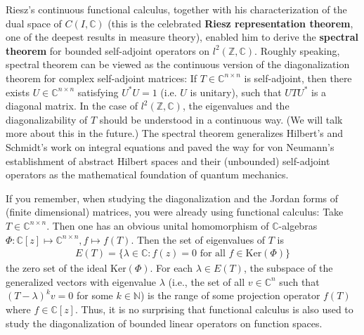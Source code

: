 \documentclass[12pt,b5paper,notitlepage]{article}
\theoremstyle{definition}
\theoremstyle{plain}
\newcommand{\Cbb}{\mathbb C}
\newcommand{\Nbb}{\mathbb N}
\newcommand{\Zbb}{\mathbb Z}
\newcommand{\Ker}{\mathrm{Ker}}
\numberwithin{equation}{section}
\begin{document}
Riesz's continuous functional calculus, together with his characterization of the dual space of $C(I,\Cbb)$ (this is the celebrated \textbf{Riesz representation theorem}, one of the deepest results in measure theory), enabled him to derive the \textbf{spectral theorem} for bounded self-adjoint operators on $l^2(\Zbb,\Cbb)$. Roughly speaking, spectral theorem can be viewed as the continuous version of the diagonalization theorem for complex self-adjoint matrices: If $T\in \Cbb^{n\times n}$ is self-adjoint, then there exists $U\in\Cbb^{n\times n}$ satisfying $U^*U=1$ (i.e. $U$ is unitary), such that $UTU^*$ is a diagonal matrix. In the case of $l^2(\Zbb,\Cbb)$, the eigenvalues and the diagonalizability of $T$ should be understood in a continuous way. (We will talk more about this in the future.) The spectral theorem generalizes Hilbert's and Schmidt's work on integral equations and paved the way for von Neumann's establishment of abstract Hilbert spaces and their (unbounded) self-adjoint operators as the mathematical foundation of quantum mechanics.




If you remember, when studying the diagonalization and the Jordan forms of (finite dimensional) matrices, you were already using functional calculus: Take $T\in\Cbb^{n\times n}$. Then one has an obvious unital homomorphism of $\Cbb$-algebras $\Phi:\Cbb[z]\mapsto\Cbb^{n\times n},f\mapsto f(T)$. Then the set of eigenvalues of $T$ is 
\begin{align*}
E(T)=\{\lambda\in\Cbb:f(z)=0\text{ for all }f\in\Ker(\Phi)\}
\end{align*}
the zero set of the ideal $\Ker(\Phi)$. For each $\lambda\in E(T)$,  the subspace of the generalized vectors with eigenvalue $\lambda$ (i.e., the set of all $v\in \Cbb^n$ such that $(T-\lambda)^kv=0$ for some $k\in\Nbb$) is the range of some projection operator $f(T)$ where $f\in\Cbb[z]$. Thus, it is no surprising that functional calculus is also used to study the diagonalization of bounded linear operators on function spaces.
\end{document}
